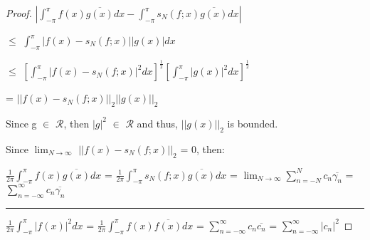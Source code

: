 \begin{proof}
        \hspace{0.5cm}
        $|\int_{-\pi}^{\pi} f(x)\overline{g(x)} dx
            - \int_{-\pi}^{\pi} s_N(f;x)\overline{g(x)} dx|$

        \hspace{0.5cm}
        $\leq$ $\int_{-\pi}^{\pi} |f(x) - s_N(f;x)||g(x)| dx$

        \hspace{0.5cm}
        $\leq$ $[\int_{-\pi}^{\pi} |f(x) - s_N(f;x)|^2 dx]^{\frac{1}{2}}
                [\int_{-\pi}^{\pi} |g(x)|^2 dx]^{\frac{1}{2}}$

        \hspace{0.5cm}
        = $||f(x) -s_N(f;x)||_2 ||g(x)||_2$

        Since g $\in$ $\mathscr{R}$, then $|g|^2$ $\in$ $\mathscr{R}$
        and thus, $||g(x)||_2$ is bounded.

        Since $\lim_{N \rightarrow \infty}$ $||f(x) - s_N(f;x)||_2$ = 0, then:

        \hspace{0.2cm}
        $\frac{1}{2\pi} \int_{-\pi}^{\pi} f(x)\overline{g(x)} dx$
        = $\frac{1}{2\pi} \int_{-\pi}^{\pi} s_N(f;x)\overline{g(x)} dx$
        = $\lim_{N \rightarrow \infty} \sum_{n=-N}^N c_n \overline{\gamma_n}$
        = $\sum_{n=-\infty}^{\infty} c_n \overline{\gamma_n}$

        \rule[0.1cm]{15.3cm}{0.01cm}

        $\frac{1}{2\pi} \int_{-\pi}^{\pi} |f(x)|^2 dx$
        = $\frac{1}{2\pi} \int_{-\pi}^{\pi} f(x)\overline{f(x)} dx$
        = $\sum_{n=-\infty}^{\infty} c_n \overline{c_n}$
        = $\sum_{n=-\infty}^{\infty} |c_n|^2$
    \end{proof}    










